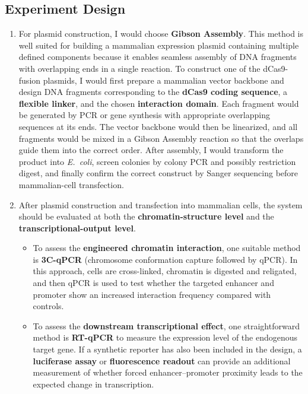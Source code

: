 \documentclass[12pt,a4paper]{article}
\begin{document}
\subsection{Experiment Design}
\begin{enumerate}[parsep=0.5\baselineskip]
  \item For plasmid construction, I would choose \textbf{Gibson Assembly}. This method is well suited for building a mammalian expression plasmid containing multiple defined components because it enables seamless assembly of DNA fragments with overlapping ends in a single reaction. To construct one of the dCas9-fusion plasmids, I would first prepare a mammalian vector backbone and design DNA fragments corresponding to the \textbf{dCas9 coding sequence}, a \textbf{flexible linker}, and the chosen \textbf{interaction domain}. Each fragment would be generated by PCR or gene synthesis with appropriate overlapping sequences at its ends. The vector backbone would then be linearized, and all fragments would be mixed in a Gibson Assembly reaction so that the overlaps guide them into the correct order. After assembly, I would transform the product into \textit{E.~coli}, screen colonies by colony PCR and possibly restriction digest, and finally confirm the correct construct by Sanger sequencing before mammalian-cell transfection.

  \item After plasmid construction and transfection into mammalian cells, the system should be evaluated at both the \textbf{chromatin-structure level} and the \textbf{transcriptional-output level}.
  \begin{itemize}
    \item To assess the \textbf{engineered chromatin interaction}, one suitable method is \textbf{3C-qPCR} (chromosome conformation capture followed by qPCR). In this approach, cells are cross-linked, chromatin is digested and religated, and then qPCR is used to test whether the targeted enhancer and promoter show an increased interaction frequency compared with controls.
    \item To assess the \textbf{downstream transcriptional effect}, one straightforward method is \textbf{RT-qPCR} to measure the expression level of the endogenous target gene. If a synthetic reporter has also been included in the design, a \textbf{luciferase assay} or \textbf{fluorescence readout} can provide an additional measurement of whether forced enhancer--promoter proximity leads to the expected change in transcription.
  \end{itemize}
\end{enumerate}
\end{document}
